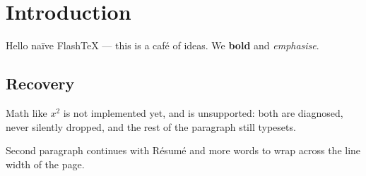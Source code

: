 \section{Introduction}
Hello naïve FlashTeX — this is a café of ideas. We \textbf{bold} and \emph{emphasise}.

\subsection{Recovery}
Math like $x^2$ is not implemented yet, and  is unsupported: both are diagnosed,
never silently dropped, and the rest of the paragraph still typesets.

Second paragraph continues with Résumé and more words to wrap across the line width of the page.
